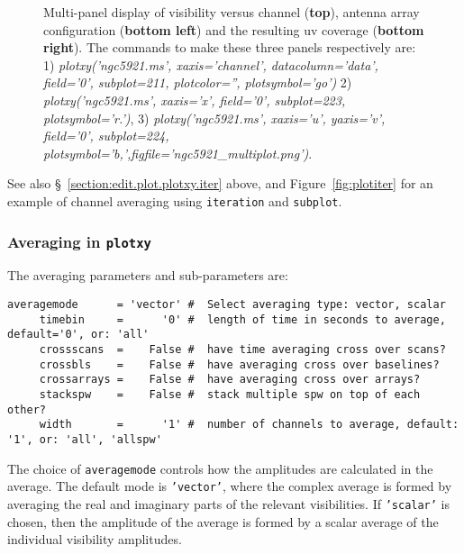 \begin{figure}[h!]
\begin{center}
\caption{\label{fig:multiplot} Multi-panel display of visibility
  versus channel ({\bf top}), antenna array configuration ({\bf bottom left})
  and the resulting uv coverage ({\bf bottom right}). The commands to
  make these three panels respectively are: 
  1) {\it plotxy('ngc5921.ms', xaxis='channel',
    datacolumn='data', field='0', subplot=211, plotcolor='',
    plotsymbol='go')}
  2) {\it plotxy('ngc5921.ms', xaxis='x', field='0', subplot=223, plotsymbol='r.')}, 
  3) {\it plotxy('ngc5921.ms', xaxis='u', yaxis='v', field='0',
    subplot=224, plotsymbol='b,',figfile='ngc5921\_multiplot.png')}.
  }
\hrulefill
\end{center}
\end{figure}

See also \S~\ref{section:edit.plot.plotxy.iter} above, and
Figure~\ref{fig:plotiter} for an example of channel 
averaging using {\tt iteration} and {\tt subplot}.
 
\subsubsection{Averaging in {\tt plotxy}}
\label{section:edit.plot.plotxy.average}

The averaging parameters and sub-parameters are:
\small
\begin{verbatim}
averagemode      = 'vector' #  Select averaging type: vector, scalar
     timebin     =      '0' #  length of time in seconds to average, default='0', or: 'all'
     crossscans  =    False #  have time averaging cross over scans?
     crossbls    =    False #  have averaging cross over baselines?
     crossarrays =    False #  have averaging cross over arrays?
     stackspw    =    False #  stack multiple spw on top of each other?
     width       =      '1' #  number of channels to average, default: '1', or: 'all', 'allspw'
\end{verbatim}
\normalsize

The choice of {\tt averagemode} controls how the amplitudes are calculated
in the average.  The default mode is {\tt 'vector'}, where the complex
average is formed by averaging the real and imaginary parts of the
relevant visibilities.  If {\tt 'scalar'} is chosen, then the
amplitude of the average is formed by a scalar average of the
individual visibility amplitudes.

